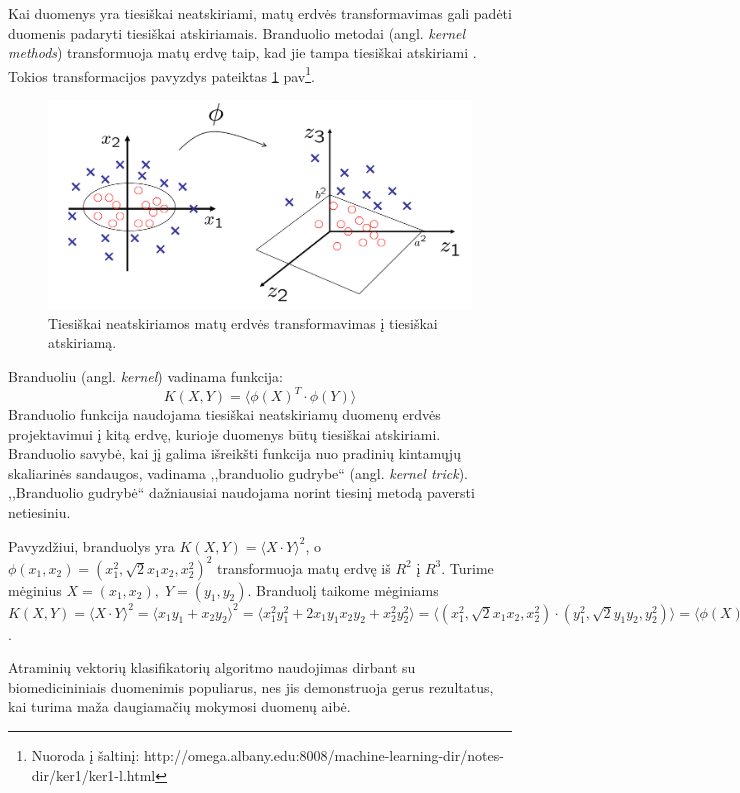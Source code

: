 Kai duomenys yra tiesiškai neatskiriami, matų erdvės transformavimas gali padėti duomenis padaryti tiesiškai atskiriamais. Branduolio metodai (angl. \textit{kernel methods}) transformuoja matų erdvę taip, kad jie tampa tiesiškai atskiriami \cite{aizerman1964theoretical}. Tokios transformacijos pavyzdys pateiktas \ref{fig:matu_erdves_transformavimas} pav\footnote{Nuoroda į šaltinį: http://omega.albany.edu:8008/machine-learning-dir/notes-dir/ker1/ker1-l.html}.
\begin{figure}
 \centering
 \includegraphics[width=.7\textwidth]{images/matu_erdves_transformavimas.png}
 \caption{Tiesiškai neatskiriamos matų erdvės transformavimas į tiesiškai atskiriamą.}
 \label{fig:matu_erdves_transformavimas}
\end{figure}

Branduoliu (angl. \textit{kernel}) vadinama funkcija:
\begin{equation}
 \label{kernel}
 K(X, Y) = \langle \phi(X)^T \cdot \phi(Y) \rangle
\end{equation}
Branduolio funkcija naudojama tiesiškai neatskiriamų duomenų erdvės projektavimui į kitą erdvę, kurioje duomenys būtų tiesiškai atskiriami. 
Branduolio savybė, kai jį galima išreikšti funkcija nuo pradinių kintamųjų skaliarinės sandaugos, vadinama ,,branduolio gudrybe`` (angl. \textit{kernel trick}). ,,Branduolio gudrybė`` dažniausiai naudojama norint tiesinį metodą paversti netiesiniu. 

Pavyzdžiui, branduolys yra $K(X, Y)=\langle X \cdot Y \rangle ^ 2$, o $\phi(x_1, x_2)=(x_1^2, \sqrt{2}x_1x_2, x_2^2)^2$ transformuoja matų erdvę iš $R^2$ į $R^3$. Turime mėginius $X=(x_1, x_2),\; Y=(y_1, y_2)$. Branduolį taikome mėginiams $K(X, Y) = \langle X \cdot Y \rangle ^ 2 = \langle x_1y_1 + x_2y_2\rangle ^ 2 = \langle x_1^2y_1^2 + 2x_1y_1x_2y_2 + x_2^2y_2^2 \rangle = \langle (x_1^2, \sqrt{2}x_1x_2, x_2^2) \cdot (y_1^2, \sqrt{2}y_1y_2, y_2^2) \rangle = \langle \phi(X) \cdot \phi(Y) \rangle$.

Atraminių vektorių klasifikatorių algoritmo naudojimas dirbant su biomedicininiais duomenimis populiarus, nes jis demonstruoja gerus rezultatus, kai turima maža daugiamačių mokymosi duomenų aibė. 

